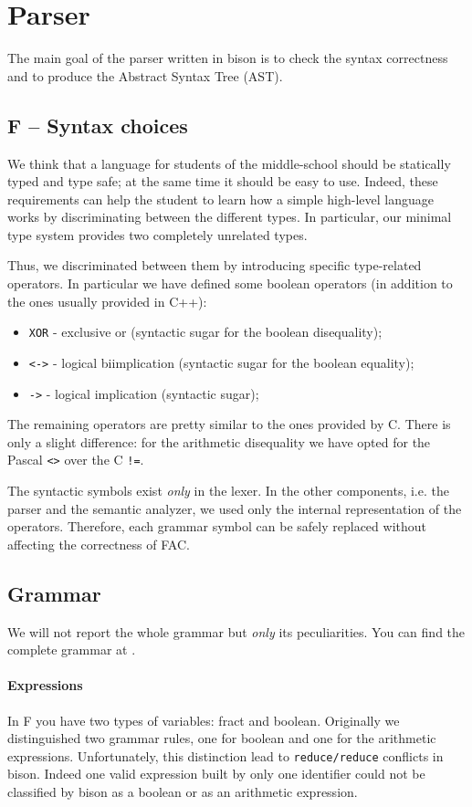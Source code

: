\section{Parser}
\label{sec:parser}
The main goal of the parser written in bison is to check the
syntax correctness and to produce the Abstract Syntax Tree (AST).

\subsection{F -- Syntax choices}
We think that a language for students of the middle-school should be
statically typed and type safe; at the same time it should be easy to use.
Indeed, these requirements can help the student to learn how a simple
high-level language works by discriminating between the different types.
In particular, our minimal type system provides two completely unrelated types.


Thus, we discriminated between them by introducing specific type-related
operators. In particular we have defined some boolean operators
(in addition to the ones usually provided in C++):
\begin{itemize}
	\item \verb|XOR| - exclusive or (syntactic sugar for the boolean disequality);
	\item \verb|<->| - logical biimplication (syntactic sugar for the boolean 
	equality);
	\item \verb|->| - logical implication (syntactic sugar);
\end{itemize}

The remaining operators are pretty similar to the ones provided by C.
There is only a slight difference: for the arithmetic disequality we have opted
for the Pascal \verb|<>| over the C \verb|!=|.

The syntactic symbols exist \emph{only} in the lexer. In the
other components, i.e. the parser and the semantic analyzer, we used
only the internal representation of the operators. Therefore, each grammar
symbol can be safely replaced without affecting the correctness of FAC.

\subsection{Grammar}
We will not report the whole grammar but \emph{only} its peculiarities.
You can find the complete grammar at .

\paragraph{Expressions}
In F you have two types of variables: fract and boolean.
Originally we distinguished two grammar rules, one for boolean and
one for the arithmetic expressions. Unfortunately, this distinction
lead to \verb|reduce/reduce| conflicts in bison.
Indeed one valid expression built by only one identifier could not be
classified by bison as a boolean or as an arithmetic expression.


